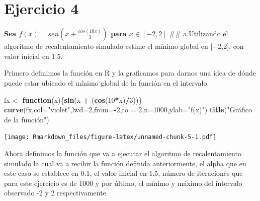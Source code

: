 \documentclass[
]{article}
\newenvironment{Shaded}{\begin{snugshade}}{\end{snugshade}}
\newcommand{\AttributeTok}[1]{\textcolor[rgb]{0.13,0.29,0.53}{#1}}
\newcommand{\ControlFlowTok}[1]{\textcolor[rgb]{0.13,0.29,0.53}{\textbf{#1}}}
\newcommand{\DecValTok}[1]{\textcolor[rgb]{0.00,0.00,0.81}{#1}}
\newcommand{\FunctionTok}[1]{\textcolor[rgb]{0.13,0.29,0.53}{\textbf{#1}}}
\newcommand{\NormalTok}[1]{#1}
\newcommand{\OtherTok}[1]{\textcolor[rgb]{0.56,0.35,0.01}{#1}}
\newcommand{\SpecialCharTok}[1]{\textcolor[rgb]{0.81,0.36,0.00}{\textbf{#1}}}
\newcommand{\StringTok}[1]{\textcolor[rgb]{0.31,0.60,0.02}{#1}}
\begin{document}
\hypertarget{ejercicio-4}{%
\section{Ejercicio 4}\label{ejercicio-4}}

\textbf{Sea \(f(x) = sen\left(x + \frac{cos(10x)}{3}\right)\) para
\(x\in[-2,2]\)} \#\# a.Utilizando el algoritmo de recalentamiento
simulado estime el mínimo global en {[}−2,2{]}, con valor inicial en
1.5.

Primero definimos la función en R y la graficamos para darnos una idea
de dónde puede estar ubicado el mínimo global de la función en el
intervalo.

\begin{Shaded}
\begin{Highlighting}[]
\NormalTok{fx }\OtherTok{\textless{}{-}} \ControlFlowTok{function}\NormalTok{(x)\{}\FunctionTok{sin}\NormalTok{(x }\SpecialCharTok{+}\NormalTok{ (}\FunctionTok{cos}\NormalTok{(}\DecValTok{10}\SpecialCharTok{*}\NormalTok{x)}\SpecialCharTok{/}\DecValTok{3}\NormalTok{))\} }
\FunctionTok{curve}\NormalTok{(fx,}\AttributeTok{col=}\StringTok{"violet"}\NormalTok{,}\AttributeTok{lwd=}\DecValTok{2}\NormalTok{,}\AttributeTok{from=}\SpecialCharTok{{-}}\DecValTok{2}\NormalTok{,}\AttributeTok{to =} \DecValTok{2}\NormalTok{,}\AttributeTok{n=}\DecValTok{1000}\NormalTok{,}\AttributeTok{ylab=}\StringTok{"f(x)"}\NormalTok{)}
\FunctionTok{title}\NormalTok{(}\StringTok{"Gráfico de la función"}\NormalTok{)}
\end{Highlighting}
\end{Shaded}

\texttt{[image: Rmarkdown\_files/figure-latex/unnamed-chunk-5-1.pdf]}

Ahora definimos la función que va a ejecutar el algoritmo de
recalentamiento simulado la cual va a recibir la función definida
anteriormente, el alpha que en este caso se establece en 0.1, el valor
inicial en 1.5, número de iteraciones que para este ejercicio es de 1000
y por último, el mínimo y máximo del intervalo observado -2 y 2
respectivamente.
\end{document}
